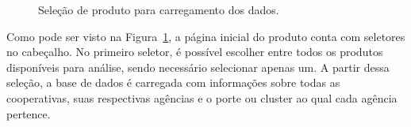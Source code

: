 \documentclass[
  12pt,
  a4paper,
]{scrreprt}
\begin{document}
\begin{figure}


\caption{\label{fig-um_produto}Seleção de produto para carregamento dos
dados.}

\end{figure}%

\vspace{12pt}

Como pode ser visto na Figura~\ref{fig-um_produto}, a página inicial do
produto conta com seletores no cabeçalho. No primeiro seletor, é
possível escolher entre todos os produtos disponíveis para análise,
sendo necessário selecionar apenas um. A partir dessa seleção, a base de
dados é carregada com informações sobre todas as cooperativas, suas
respectivas agências e o porte ou cluster ao qual cada agência pertence.
\end{document}
